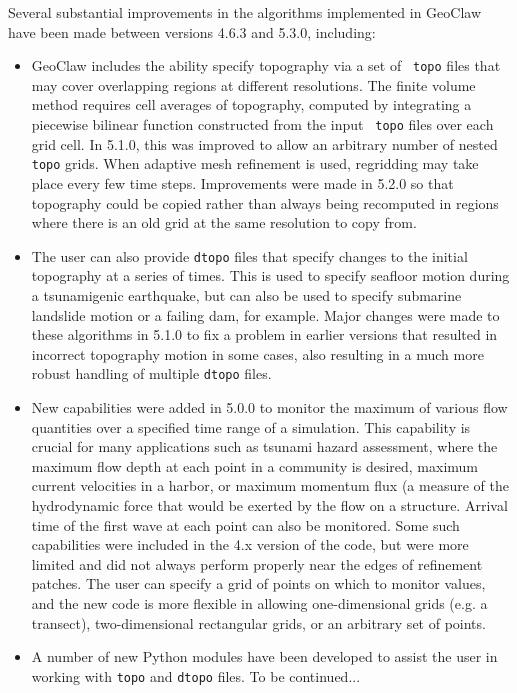 Several substantial improvements in the
algorithms implemented in GeoClaw have been made between versions 4.6.3 and
5.3.0, including:

\begin{itemize} 
\item GeoClaw includes the ability specify topography via a set of {\tt
topo} files that may cover overlapping regions at different resolutions. The
finite volume method requires cell averages of topography, computed by
integrating a piecewise bilinear function constructed from the input {\tt
topo} files over each grid cell.  In 5.1.0, this was improved to 
allow an arbitrary number of nested {\tt topo} grids.
When adaptive mesh refinement is used,
regridding may take place every few time steps.  Improvements were made 
in 5.2.0 so that topography could be copied rather than always being
recomputed in regions where there is an old grid at the same resolution to
copy from.  

\item The user can also provide {\tt dtopo} files that specify changes to
the initial topography at a series of times.  This is used to specify
seafloor motion during a tsunamigenic earthquake, but can also be used to
specify submarine landslide motion or a failing dam, for example.
Major changes were made to these algorithms in 5.1.0 to fix a problem
in earlier versions that resulted in incorrect topography motion in some
cases, also resulting in a much more robust handling of multiple 
{\tt dtopo} files.

\item New capabilities were added in 5.0.0 to monitor the maximum of various
flow quantities over a specified time range of a simulation.  This
capability is crucial for many applications such as tsunami hazard
assessment, where the maximum flow depth at each point in a community is
desired, maximum current velocities in a harbor, or maximum momentum flux (a
measure of the hydrodynamic force that would be exerted by the flow on a
structure.  Arrival time of the first wave at each point can also be
monitored.  Some such capabilities were included in the 4.x version of the code,
but were more limited and did not always perform properly near the edges of
refinement patches.  The user can specify a grid
of points on which to monitor values, and the new code is more flexible in
allowing one-dimensional grids (e.g. a transect), two-dimensional
rectangular grids, or an arbitrary set of points.

\item A number of new Python modules have been developed to assist the user
in working with {\tt topo} and {\tt dtopo} files.  To be continued...

\end{itemize} 

